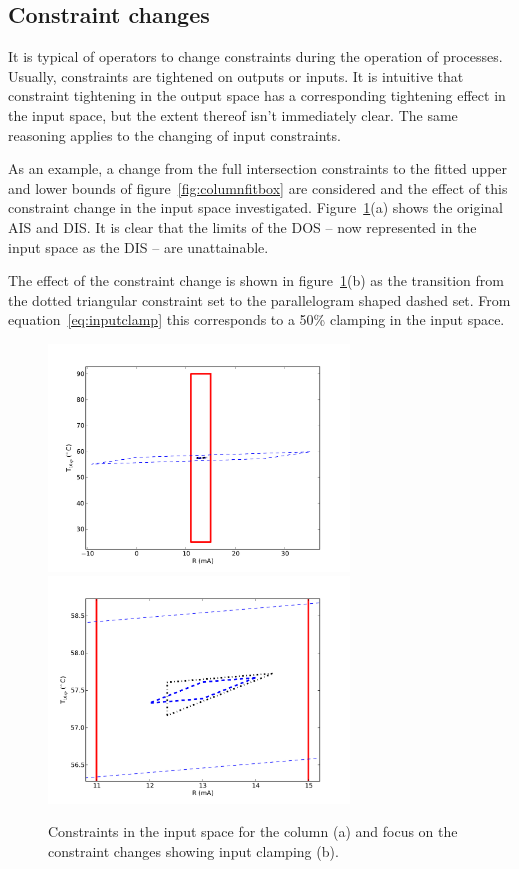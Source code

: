 \documentclass[final,authoryear,5pt,times,twocolumn]{elsarticle}
\begin{document}
\subsection{Constraint changes}
It is typical of operators to change constraints during the operation of processes.
Usually, constraints are tightened on outputs or inputs.
It is intuitive that constraint tightening in the output space has a corresponding tightening effect in the input space, but the extent thereof isn't immediately clear.
The same reasoning applies to the changing of input constraints.

As an example, a change from the full intersection constraints to the fitted upper and lower bounds of figure~\ref{fig:columnfitbox} are considered and the effect of this constraint change in the input space investigated.
Figure~\ref{fig:columnconsinput}(a) shows the original AIS and DIS.
It is clear that the limits of the DOS -- now represented in the input space as the DIS -- are unattainable.

The effect of the constraint change is shown in figure~\ref{fig:columnconsinput}(b) as the transition from the dotted triangular constraint set to the parallelogram shaped dashed set.
From equation~\ref{eq:inputclamp} this corresponds to a 50\% clamping in the input space.

\begin{figure}[htbp]
  \centering
    \includegraphics[width=8cm]{columninputs.pdf}
    \includegraphics[width=8cm]{columninputszoom.pdf}
  \caption{Constraints in the input space for the column (a) and focus on the constraint changes showing input clamping (b).}
  \label{fig:columnconsinput}
\end{figure}
\end{document}
